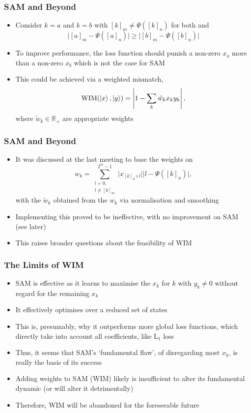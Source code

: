 \documentclass{beamer}
\begin{document}
\begin{frame}
\frametitle{SAM and Beyond}
\begin{itemize}
\item Consider $k=a$ and $k=b$ with $[k]_m \neq \Psi([k]_n)$ for both and 
\begin{equation}
\Big|[a]_m - \Psi([a]_n) \Big| \geq \Big|[b]_m - \Psi([b]_n) \Big| 
\end{equation}
\item To improve performance, the loss function should punish a non-zero $x_a$ more than a non-zero $x_b$ which is not the case for SAM
\item This could be achieved via a \alert{weighted mismatch}, 
\begin{equation}
\text{WIM}(\ket{x}, \ket{y}) = \left\vert 1 - \sum_k \tilde{w}_k x_k y_k \right\vert, 
\end{equation}
where $\tilde{w}_k \in \mathbb{R}_+$ are appropriate weights
\end{itemize}
\end{frame}

\begin{frame}
\frametitle{SAM and Beyond}
\begin{itemize}
\item It was discussed at the last meeting to base the weights on
\begin{equation}
w_k = \sum^{2^m -1}_{\substack{l=0, \\ l \neq [k]_m}} \Big|x_{[k]_n \diamond l} \Big| \Big| l - \Psi([k]_n) \Big|,
\end{equation}
with the $\tilde{w}_k$ obtained from the $w_k$ via normalisation and smoothing
\item Implementing this \alert{proved to be ineffective}, with no improvement on SAM  (see later)
\item This raises broader questions about the \alert{feasibility of WIM}
\end{itemize}
\end{frame}

\begin{frame}
\frametitle{The Limits of WIM}
\begin{itemize}
\item SAM is effective as it learns to maximise the $x_k$ for $k$ with $y_k \neq 0$ without regard for the remaining $x_k$
\item It effectively optimises over a \alert{reduced set of states} 
\item This is, presumably, why it outperforms more global loss functions, which directly take into account all coefficients, like L$_1$ loss 
\item Thus, it seems that SAM's \alert{`fundamental flaw'}, of disregarding most $x_k$, is really the \alert{basis of its success} 
\item Adding weights to SAM (WIM) likely is insufficient to alter its fundamental dynamic (or will alter it detrimentally)  
\item Therefore, \alert{WIM will be abandoned for the foreseeable future}
\end{itemize}
\end{frame}
\end{document}
